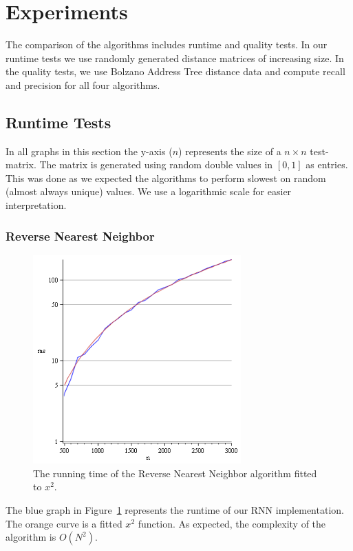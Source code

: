 \documentclass[a4paper,11pt]{article}
\begin{document}
\section{Experiments}

The comparison of the algorithms includes runtime and quality tests. In our runtime tests we use randomly generated distance matrices of increasing size. In the quality tests, we use Bolzano Address Tree distance data and compute recall and precision for all four algorithms.

\subsection{Runtime Tests}

In all graphs in this section the y-axis ($n$) represents the size of a $n \times n$ test-matrix. The matrix is generated using random double values in $[0,1]$ as entries. This was done as we expected the algorithms to perform slowest on random (almost always unique) values. We use a logarithmic scale for easier interpretation.

\subsubsection{Reverse Nearest Neighbor}

\begin{figure}[ht!]
\centering 
\includegraphics[width=80mm]{RNN_runtime.png}
\caption{The running time of the Reverse Nearest Neighbor algorithm fitted to $x^2$.}
\label{rnn} 
\end{figure}

The blue graph in Figure~\ref{rnn} represents the runtime of our RNN implementation. The orange curve is a fitted $x^2$ function. As expected, the complexity of the algorithm is $O(N^{2})$.
\end{document}
